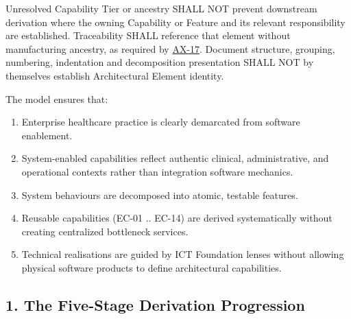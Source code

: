 \label{rad:tier-model:34}

Unresolved Capability Tier or ancestry SHALL NOT prevent downstream derivation where the owning Capability or Feature and its relevant responsibility are established. Traceability SHALL reference that element without manufacturing ancestry, as required by \href{https://github.com/fhirfactory/harmonia/blob/98410db60155198a75f74c79d98060070209faa1/docs/markdown/governance/architectural-axioms.md\#ax-17}{AX-17}. Document structure, grouping, numbering, indentation and decomposition presentation SHALL NOT by themselves establish Architectural Element identity.

\label{rad:tier-model:36}

The model ensures that:

\label{rad:tier-model:37}

\begin{enumerate}

\item 
Enterprise healthcare practice is clearly demarcated from software enablement.



\item 
System-enabled capabilities reflect authentic clinical, administrative, and operational contexts rather than integration software mechanics.



\item 
System behaviours are decomposed into atomic, testable features.



\item 
Reusable capabilities (EC-01 .. EC-14) are derived systematically without creating centralized bottleneck services.



\item 
Technical realisations are guided by ICT Foundation lenses without allowing physical software products to define architectural capabilities.



\end{enumerate}
\label{rad:tier-model:43}

\par\smallskip
{}\label{rad:tier-model:45}
\subsection*{1. The Five-Stage Derivation Progression}
\label{rad:tier-model:47}

